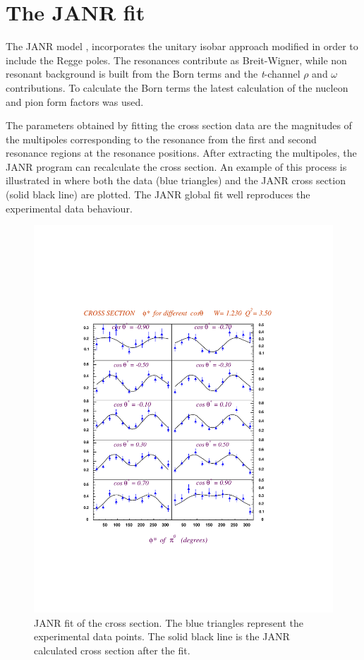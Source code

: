 \cia  \vspace{-2cm}
\section{The JANR fit}
The JANR model \cite{bib:Inna1}, \cite{bib:Inna2} incorporates the unitary isobar approach \cite{bib:maid2000}
modified in order to
include the Regge poles. The resonances contribute as Breit-Wigner, while non resonant background is built 
from the
Born terms and the {\it t}-channel $\rho$ and $\omega$ contributions. To calculate the Born terms
the latest calculation of
the nucleon and pion form factors was used. 

The parameters obtained by fitting the cross section data are the magnitudes of the multipoles
corresponding to the resonance from the first and second resonance regions at the resonance positions.
After extracting the multipoles, the JANR program can recalculate the cross section. An example of this process is illustrated
in  where both the data (blue triangles) and the JANR cross section (solid black line) are plotted.
The JANR global fit well reproduces the experimental data behaviour. 

\begin{figure}[h]
 \includegraphics[width = 13cm, bb=-30 140 520 640]{analysis/img/cro_phi_W1.23_Q23.50_Inn}
  \caption[JANR fit of the cross section.]
{ JANR fit of the cross section. The blue triangles represent the experimental data points. The solid black line
 is the JANR calculated cross section after the fit.}
 \label{fig:cro_phi_W1.23_Q23.50_Inn}
\end{figure}

